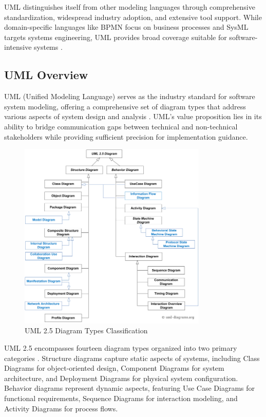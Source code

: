 UML distinguishes itself from other modeling languages through comprehensive standardization, widespread industry adoption, and extensive tool support. While domain-specific languages like BPMN focus on business processes and SysML targets systems engineering, UML provides broad coverage suitable for software-intensive systems \cite{uml_comparison}.

\subsection{UML Overview}

UML (Unified Modeling Language) serves as the industry standard for software system modeling, offering a comprehensive set of diagram types that address various aspects of system design and analysis \cite{uml_specification}. UML's value proposition lies in its ability to bridge communication gaps between technical and non-technical stakeholders while providing sufficient precision for implementation guidance.

\begin{figure}[htbp]
\centering
\includegraphics[width=0.8\textwidth]{pictures/web/uml-25-diagrams.png}
\caption{UML 2.5 Diagram Types Classification}
\label{fig:uml_diagrams}
\end{figure}

UML 2.5 encompasses fourteen diagram types organized into two primary categories \cite{uml25_diagrams}. Structure diagrams capture static aspects of systems, including Class Diagrams for object-oriented design, Component Diagrams for system architecture, and Deployment Diagrams for physical system configuration. Behavior diagrams represent dynamic aspects, featuring Use Case Diagrams for functional requirements, Sequence Diagrams for interaction modeling, and Activity Diagrams for process flows.

